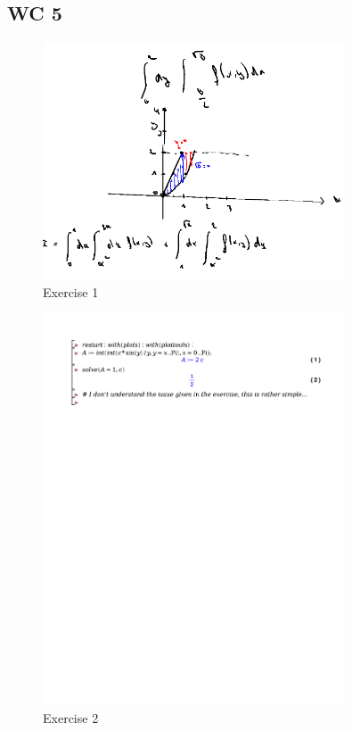 \documentclass[a4paper]{article}
\begin{document}
\subsection*{WC 5}

\begin{figure}[H]
	\centering
	\includegraphics[width=0.8\textwidth]{assets/wc_5_ex_1.png}
	\caption{Exercise 1}
	\label{fig:wc_5_ex_1}
\end{figure}

\begin{figure}[H]
	\centering
	\includegraphics[width=0.8\textwidth]{exercises/wc_5_ex_2.pdf}
	\caption{Exercise 2}
	\label{fig:wc_5_ex_2}
\end{figure}
\end{document}
